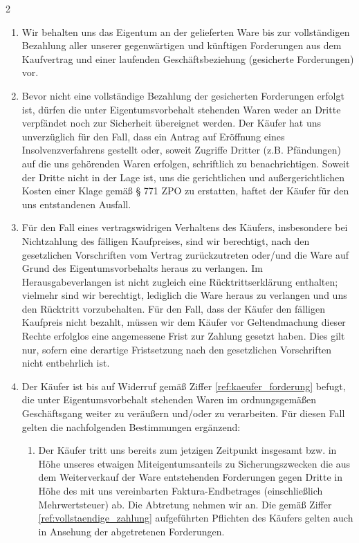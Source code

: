\documentclass[%
    a4paper,%
    10pt,
]{scrartcl}
\begin{document}
\begin{multicols}{2}
\begin{enumerate}
          \begin{enumerate}
          \item Wir behalten uns das Eigentum an der gelieferten Ware bis zur vollständigen Bezahlung aller unserer gegenwärtigen und künftigen Forderungen aus dem Kaufvertrag und einer laufenden Geschäftsbeziehung (gesicherte Forderungen) vor.
          \item \label{ref:vollstaendige_zahlung}Bevor nicht eine vollständige Bezahlung der gesicherten Forderungen erfolgt ist, dürfen die unter Eigentumsvorbehalt stehenden Waren weder an Dritte verpfändet noch zur Sicherheit übereignet werden. Der Käufer hat uns unverzüglich für den Fall, dass ein Antrag auf Eröffnung eines Insolvenzverfahrens gestellt oder, soweit Zugriffe Dritter (z.B. Pfändungen) auf die uns gehörenden Waren erfolgen, schriftlich zu benachrichtigen. Soweit der Dritte nicht in der Lage ist, uns die gerichtlichen und außergerichtlichen Kosten einer Klage gemäß § 771 ZPO zu erstatten, haftet der Käufer für den uns entstandenen Ausfall.
          \item \label{ref:ausfall_ruecktritt} Für den Fall eines vertragswidrigen Verhaltens des Käufers, insbesondere bei Nichtzahlung des fälligen Kaufpreises, sind wir berechtigt, nach den gesetzlichen Vorschriften vom Vertrag zurückzutreten oder/und die Ware auf Grund des Eigentumsvorbehalts heraus zu verlangen. Im Herausgabeverlangen ist nicht zugleich eine Rücktrittserklärung enthalten; vielmehr sind wir berechtigt, lediglich die Ware heraus zu verlangen und uns den Rücktritt vorzubehalten. Für den Fall, dass der Käufer den fälligen Kaufpreis nicht bezahlt, müssen wir dem Käufer vor Geltendmachung dieser Rechte erfolglos eine angemessene Frist zur Zahlung gesetzt haben. Dies gilt nur, sofern eine derartige Fristsetzung nach den gesetzlichen Vorschriften nicht entbehrlich ist.
          \item Der Käufer ist bis auf Widerruf gemäß Ziffer \ref{ref:kaeufer_forderung} befugt, die unter Eigentumsvorbehalt stehenden Waren im ordnungsgemäßen Geschäftsgang weiter zu veräußern und/oder zu verarbeiten. Für diesen Fall gelten die nachfolgenden Bestimmungen ergänzend:%
            \begin{enumerate}
            \item Der Käufer tritt uns bereits zum jetzigen Zeitpunkt insgesamt bzw. in Höhe unseres etwaigen Miteigentumsanteils zu Sicherungszwecken die aus dem Weiterverkauf der Ware entstehenden Forderungen gegen Dritte in Höhe des mit uns vereinbarten Faktura-Endbetrages (einschließlich Mehrwertsteuer) ab. Die Abtretung nehmen wir an. Die gemäß Ziffer \ref{ref:vollstaendige_zahlung} aufgeführten Pflichten des Käufers gelten auch in Ansehung der abgetretenen Forderungen.

\end{enumerate}
\end{enumerate}
\end{enumerate}
\end{multicols}
\end{document}
